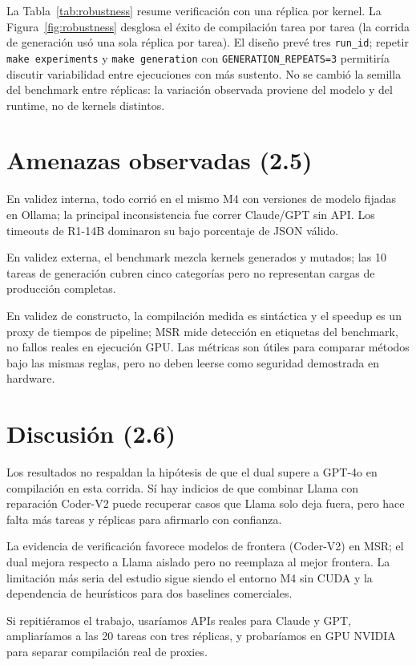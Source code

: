 La Tabla~\ref{tab:robustness} resume verificación con una réplica por kernel. La Figura~\ref{fig:robustness} desglosa el éxito de compilación tarea por tarea (la corrida de generación usó una sola réplica por tarea). El diseño prevé tres \texttt{run\_id}; repetir \texttt{make experiments} y \texttt{make generation} con \texttt{GENERATION\_REPEATS=3} permitiría discutir variabilidad entre ejecuciones con más sustento. No se cambió la semilla del benchmark entre réplicas: la variación observada proviene del modelo y del runtime, no de kernels distintos.

\section{Amenazas observadas (2.5)}

En validez interna, todo corrió en el mismo M4 con versiones de modelo fijadas en Ollama; la principal inconsistencia fue correr Claude/GPT sin API. Los timeouts de R1-14B dominaron su bajo porcentaje de JSON válido.

En validez externa, el benchmark mezcla kernels generados y mutados; las 10 tareas de generación cubren cinco categorías pero no representan cargas de producción completas.

En validez de constructo, la compilación medida es sintáctica y el speedup es un proxy de tiempos de pipeline; MSR mide detección en etiquetas del benchmark, no fallos reales en ejecución GPU. Las métricas son útiles para comparar métodos bajo las mismas reglas, pero no deben leerse como seguridad demostrada en hardware.

\section{Discusión (2.6)}

Los resultados no respaldan la hipótesis de que el dual supere a GPT-4o en compilación en esta corrida. Sí hay indicios de que combinar Llama con reparación Coder-V2 puede recuperar casos que Llama solo deja fuera, pero hace falta más tareas y réplicas para afirmarlo con confianza.

La evidencia de verificación favorece modelos de frontera (Coder-V2) en MSR; el dual mejora respecto a Llama aislado pero no reemplaza al mejor frontera. La limitación más seria del estudio sigue siendo el entorno M4 sin CUDA y la dependencia de heurísticos para dos baselines comerciales.

Si repitiéramos el trabajo, usaríamos APIs reales para Claude y GPT, ampliaríamos a las 20 tareas con tres réplicas, y probaríamos en GPU NVIDIA para separar compilación real de proxies.

